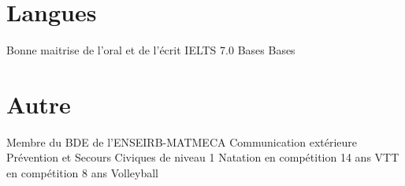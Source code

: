 \documentclass{cvdebatard}
\begin{document}
\section{Langues}
\begin{cventrylist}
            {\textnormal{Bonne maitrise de l'oral et de l'écrit}}
            {IELTS 7.0}{}{}
            {\textnormal{Bases}}
            {}{}{}
            {\textnormal{Bases}}
            {}{}{}
\end{cventrylist}

\section{Autre}
\begin{cventrylist}
            {Membre du BDE de l'ENSEIRB-MATMECA}
            {\newline Communication extérieure}
            {}{}
            {Prévention et Secours Civiques de niveau 1}
            {}{}{}
            {\textnormal{Natation en compétition}}
            {14 ans}
            {}{}
    \cventry{}
            {\textnormal{VTT en compétition}}
            {8 ans}
            {}{}
    \cventry{}
            {\textnormal{Volleyball}}
            {}{}{}
\end{cventrylist}
\end{document}
